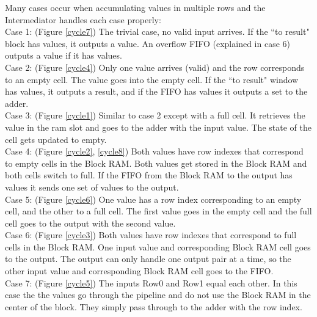 \par Many cases occur when accumulating values in multiple rows and the Intermediator handles each case properly:
\\\indent Case 1: (Figure \ref{cycle7}) The trivial case, no valid input arrives. If the ``to result" block has values, it outputs a value. An overflow FIFO (explained in case 6) outputs a value if it has values.
\\\indent Case 2: (Figure \ref{cycle4}) Only one value arrives (valid) and the row corresponds to an empty cell. The value goes into the empty cell. If the ``to result" window has values, it outputs a result, and if the FIFO has values it outputs a set to the adder.
\\\indent Case 3: (Figure \ref{cycle1}) Similar to case 2 except with a full cell. It retrieves the value in the ram slot and goes to the adder with the input value. The state of the cell gets updated to empty.
\\\indent Case 4: (Figure \ref{cycle2}, \ref{cycle8}) Both values have row indexes that correspond to empty cells in the Block RAM. Both values get stored in the Block RAM and both cells switch to full. If the FIFO from the Block RAM to the output has values it sends one set of values to the output. 
\\\indent Case 5: (Figure \ref{cycle6}) One value has a row index corresponding to an empty cell, and the other to a full cell. The first value goes in the empty cell and the full cell goes to the output with the second value. 
\\\indent Case 6: (Figure \ref{cycle3}) Both values have row indexes that correspond to full cells in the Block RAM. One input value and corresponding Block RAM cell goes to the output. The output can only handle one output pair at a time, so the other input value and corresponding Block RAM cell goes to the FIFO.
\\\indent Case 7: (Figure \ref{cycle5}) The inputs Row0 and Row1 equal each other. In this case the the values go through the pipeline and do not use the Block RAM in the center of the block. They simply pass through to the adder with the row index.\\
%

